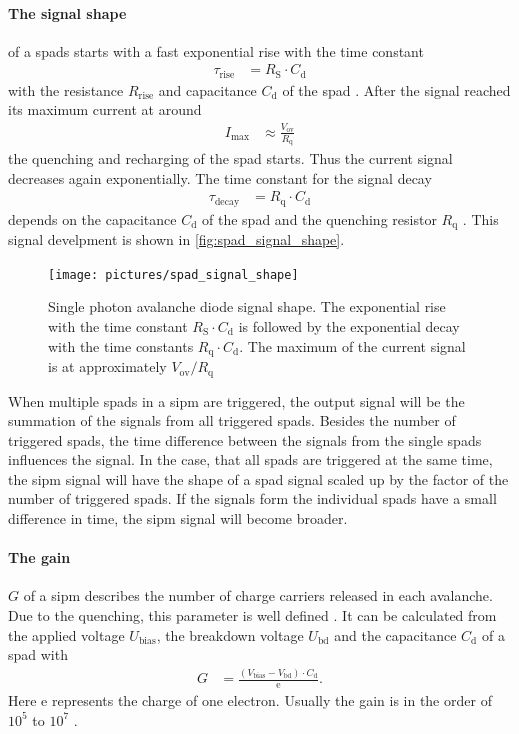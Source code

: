 \paragraph{The signal shape} of a \acp{spad} starts with a fast exponential rise with the time constant 
\begin{align}
	\tau_\text{rise}&=R_\text{S}\cdot C_\text{d}
\end{align}
with the resistance $R_\text{rise}$ and capacitance $C_\text{d}$ of the \ac{spad} \cite{HAMA_mppc}.
After the signal reached its maximum current at around 
\begin{align}
	I_\text{max}&\approx \frac{V_\text{ov}}{R_\text{q}}
\end{align}
the quenching and recharging of the \ac{spad} starts.
Thus the current signal decreases again exponentially.
The time constant for the signal decay
\begin{align}
	\tau_\text{decay} &= R_\text{q}\cdot C_\text{d}
\end{align}
depends on the capacitance $C_\text{d}$ of the \ac{spad} and the quenching resistor $R_\text{q}$ \cite{HAMA_mppc}.
This signal develpment is shown in \autoref{fig:spad_signal_shape}.
\begin{figure}
	\centering
	\texttt{[image: pictures/spad\_signal\_shape]}
	\caption[SPAD signal shape]{Single photon avalanche diode signal shape. The exponential rise with the time constant $R_\text{S}\cdot C_\text{d}$ is followed by the exponential decay with the time constants $R_\text{q}\cdot C_\text{d}$. The maximum of the current signal is at approximately $V_\text{ov}/R_\text{q}$ \cite{HAMA_mppc}}
	\label{fig:spad_signal_shape}
\end{figure}

When multiple \acp{spad} in a \ac{sipm} are triggered, the output signal will be the summation of the signals from all triggered \acp{spad}.
Besides the number of triggered \acp{spad}, the time difference between the signals from the single \acp{spad} influences the signal.
In the case, that all \acp{spad} are triggered at the same time, the \ac{sipm} signal will have the shape of a \ac{spad} signal scaled up by the factor of the number of triggered \acp{spad}.
If the signals form the individual \acp{spad} have a small difference in time, the \ac{sipm} signal will become broader.




\paragraph{The gain} $G$ of a \ac{sipm} describes the number of charge carriers released in each avalanche.
Due to the quenching, this parameter is well defined \cite{}.
It can be calculated from the applied voltage $U_\text{bias}$, the breakdown voltage $U_\text{bd}$ and the capacitance $C_\text{d}$ of a \ac{spad} with
\begin{align}
	G &= \frac{(V_\text{bias}- V_\text{bd})\cdot C_\text{d}}{\text{e}}.
\end{align}
Here e represents the charge of one electron.
Usually the gain is in the order of $10^5$ to $10^7$ \cite{nucl}.

